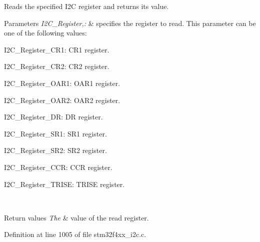 Reads the specified I2\-C register and returns its value. 


\begin{DoxyParams}{Parameters}
{\em I2\-C\-\_\-\-Register,\-:} & specifies the register to read. This parameter can be one of the following values\-: \begin{DoxyItemize}
\item I2\-C\-\_\-\-Register\-\_\-\-C\-R1\-: C\-R1 register. \item I2\-C\-\_\-\-Register\-\_\-\-C\-R2\-: C\-R2 register. \item I2\-C\-\_\-\-Register\-\_\-\-O\-A\-R1\-: O\-A\-R1 register. \item I2\-C\-\_\-\-Register\-\_\-\-O\-A\-R2\-: O\-A\-R2 register. \item I2\-C\-\_\-\-Register\-\_\-\-D\-R\-: D\-R register. \item I2\-C\-\_\-\-Register\-\_\-\-S\-R1\-: S\-R1 register. \item I2\-C\-\_\-\-Register\-\_\-\-S\-R2\-: S\-R2 register. \item I2\-C\-\_\-\-Register\-\_\-\-C\-C\-R\-: C\-C\-R register. \item I2\-C\-\_\-\-Register\-\_\-\-T\-R\-I\-S\-E\-: T\-R\-I\-S\-E register. \end{DoxyItemize}
\\
\hline
\end{DoxyParams}

\begin{DoxyRetVals}{Return values}
{\em The} & value of the read register. \\
\hline
\end{DoxyRetVals}


Definition at line 1005 of file stm32f4xx\-\_\-i2c.\-c.

